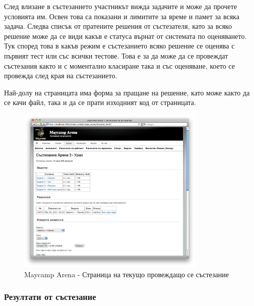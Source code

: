 \documentclass[a4paper,12pt]{article}
\begin{document}
  След влизане в състезанието участникът вижда задачите и може да прочете условията им. Освен това са показани и лимитите за време и памет за всяка задача. Следва списък от пратените решения от състезателя, като за всяко решение може да се види какъв е статуса върнат от системата по оценяването. Тук според това в какъв режим е състезанието всяко решение се оценява с първият тест или със всички тестове. Това е за да може да се провеждат състезания както и с моментално класиране така и със оценяване, което се провежда след края на състезанието.
  
  Най-долу на страницата има форма за пращане на решение, като може както да се качи файл, така и да се прати изходният код от страницата.

  \begin{figure}[ht]
    \begin{center}
      \includegraphics[width=0.8\textwidth]{images/maycamp_arena_contest.png}
    \end{center}
    \caption{Maycamp Arena - Страница на текущо провеждащо се състезание}
    \label{arena_contest_page}
  \end{figure}
  
  \pagebreak
  
  \subsubsection{Резултати от състезание}
\end{document}
